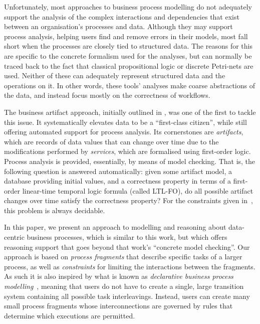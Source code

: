 \documentclass{llncs}
\begin{document}
Unfortunately, most approaches to business process modelling do not adequately support the analysis of the complex interactions and dependencies that exist between an organisation's processes and data.
Although they may support process analysis, helping users find and remove errors in their models, most fall short when the processes are closely tied to structured data.
The reasons for this are specific to the concrete formalism used for the analyses, but can normally be traced back to the fact that classical propositional logic or discrete Petri-nets are used.
Neither of these can adequately represent structured data and the operations on it.
In other words, these tools' analyses make coarse abstractions of the data, and instead focus mostly on the correctness of workflows.

The business artifact approach, initially outlined in \cite{DBLP:journals/ibmsj/NigamC03}, was one of the first to tackle this issue.
It systematically elevates data to be a ``first-class citizen'', while still offering automated support for process analysis.
Its cornerstones are
\emph{artifacts}, which are records of data values that can change over
time due to the modifications performed by \emph{services}, which are
formalised using first-order logic.
Process analysis is provided, essentially, by means of model checking.
That is, the following question is answered automatically: given some artifact model, a database providing initial values, and a correctness property in terms of a first-order linear-time temporal logic formula (called LTL-FO), do all possible artifact changes over time satisfy the correctness property?
For the constraints given in~\cite{DBLP:conf/bpm/DamaggioDHV11}, this problem is always decidable.

In this paper, we present an approach to modelling and reasoning about data-centric business processes, which is similar to this work, but which offers reasoning support that goes beyond that work's ``concrete model checking''.
Our approach is based on \emph{process fragments} that describe specific tasks of a larger process, as well as \emph{constraints} for limiting the interactions between the fragments.
As such it is also inspired by what is known as \emph{declarative
  business process modelling}~\cite{DBLP:conf/bpm/PesicA06}, meaning
that users do not have to create a single, large transition system
containing all possible task interleavings.
Instead, users can create many small process fragments whose interconnections are governed by rules that determine which executions are permitted.
\end{document}

